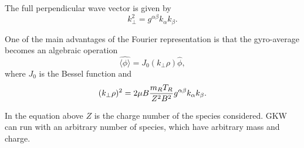 The full perpendicular wave vector is given by 
\begin{equation} 
k_\perp^2 = g^{\alpha \beta} k_\alpha k_\beta .
\end{equation}

One of the main advantages of the Fourier representation is that the gyro-average becomes
an algebraic operation
\begin{equation} 
\widehat{\langle \phi \rangle} = J_0 ( k_\perp \rho) \widehat \phi ,
\label{Bessel}
\end{equation}
where $J_0$ is the Bessel function and 
\begin{equation} 
(k_\perp \rho)^2 = 2\mu B {m_R T_R \over Z^2 B^2} g^{\alpha \beta} k_\alpha k_\beta .
\end{equation}


In the equation above $Z$ is the charge number of the species considered. GKW can run with 
an arbitrary number of species, which have arbitrary mass and charge.  

\newpage

